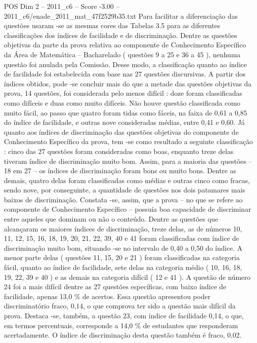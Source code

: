 \begin{textsample}{POS Dim 2 – 2011\_c6 – Score -3.00 – 2011\_c6/enade\_2011\_mat\_47f2529b35.txt}
Para facilitar a diferenciação das questões usaram -se as mesmas cores das Tabelas 3.5 para as diferentes classificações dos índices de facilidade e de discriminação.
Dentre as questões objetivas da parte da prova relativa ao componente de Conhecimento Específico da Área de Matemática – Bacharelado ( questões 9 a 25 e 36 a 45 ), nenhuma questão foi anulada pela Comissão.
Desse modo, a classificação quanto ao índice de facilidade foi estabelecida com base nas 27 questões discursivas.
A partir dos índices obtidos, pode -se concluir mais do que a metade das questões objetivas da prova, 14 questões, foi considerada pelo menos difícil : doze foram classificadas como difíceis e duas como muito difíceis.
Não houve questão classificada como muito fácil, ao passo que quatro foram tidas como fáceis, na faixa de 0,61 a 0,85 do índice de facilidade, e outras nove consideradas médias, entre 0,41 e 0,60.
Já quanto aos índices de discriminação das questões objetivas do componente de Conhecimento Específico da prova, tem -se como resultado a seguinte classificação : cinco das 27 questões foram consideradas como boas, enquanto treze delas tiveram índice de discriminação muito bom.
Assim, para a maioria das questões – 18 em 27 – os índices de discriminação foram bons ou muito bons.
Dentre as demais, quatro delas foram classificadas como médias e outras cinco como fracas, sendo nove, por conseguinte, a quantidade de questões nos dois patamares mais baixos de discriminação.
Constata -se, assim, que a prova – no que se refere ao componente de Conhecimento Específico – possuía boa capacidade de discriminar entre aqueles que dominam ou não o conteúdo.
Dentre as questões que alcançaram os maiores índices de discriminação, treze delas, as de números 10, 11, 12, 15, 16, 18, 19, 20, 21, 22, 39, 40 e 41 foram classificadas com índice de discriminação muito bom, situando -se no intervalo de 0,40 a 0,50 do índice.
A menor parte delas ( questões 11, 15, 20 e 21 ) foram classificadas na categoria fácil, quanto ao índice de facilidade, sete delas na categoria médio ( 10, 16, 18, 19, 22, 39 e 40 ) e as demais na categoria difícil ( 12 e 41 ).
A questão de número 24 foi a mais difícil dentre as 27 questões específicas, com baixo índice de facilidade, apenas 13,0 \% de acertos.
Essa questão apresentou poder discriminatório fraco, 0,14, o que comprova ter sido a questão mais difícil da prova.
Destaca -se, também, a questão 23, com índice de facilidade 0,14, o que, em termos percentuais, corresponde a 14,0 \% de estudantes que responderam acertadamente.
O índice de discriminação desta questão também é fraco, 0,02.

\end{textsample}
